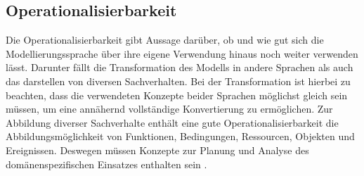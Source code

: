 \subsection{Operationalisierbarkeit}
\label{ssc:Operationalisierbarkeit}
Die Operationalisierbarkeit gibt Aussage darüber, ob und wie gut sich die Modellierungssprache über ihre eigene Verwendung hinaus noch weiter verwenden lässt.
Darunter fällt die Transformation des Modells in andere Sprachen als auch das darstellen von diversen Sachverhalten.
Bei der Transformation ist hierbei zu beachten, dass die verwendeten Konzepte beider Sprachen möglichst gleich sein müssen,
um eine annähernd vollständige Konvertierung zu ermöglichen. Zur Abbildung diverser Sachverhalte enthält eine gute Operationalisierbarkeit die Abbildungsmöglichkeit von Funktionen, Bedingungen, Ressourcen, Objekten und Ereignissen.
Deswegen müssen Konzepte zur Planung und Analyse des domänenspezifischen Einsatzes enthalten sein \cite[95\psq]{JaneFroeming_2009}.

